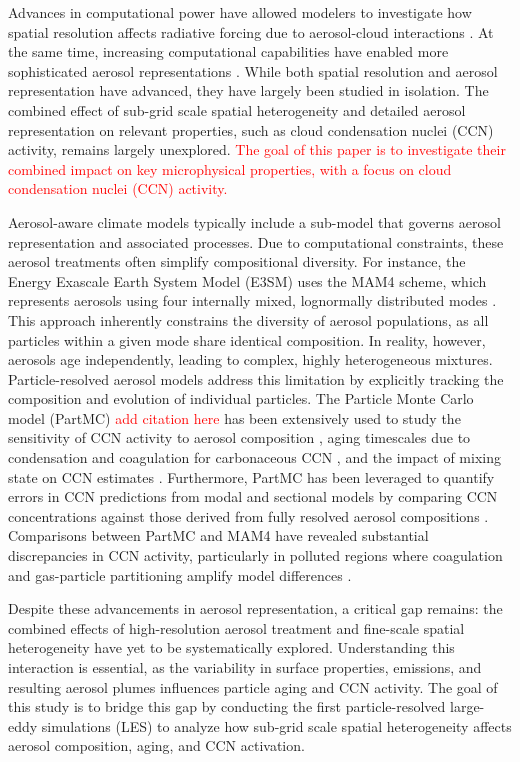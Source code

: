 \documentclass[journal abbreviation, manuscript]{copernicus}
\begin{document}
Advances in computational power have allowed modelers to investigate
how spatial resolution affects radiative forcing due to aerosol-cloud
interactions \citep{ma_how_2015}. At the same time, increasing
computational capabilities have enabled more sophisticated aerosol
representations \citep{zaveri_development_2021,
  tilmes_description_2023}. While both spatial resolution and aerosol
representation have advanced, they have largely been studied in
isolation. The combined effect of sub-grid scale spatial heterogeneity
and detailed aerosol representation on relevant properties, such as
cloud condensation nuclei (CCN) activity, remains largely unexplored.
\textcolor{red}{The goal of this paper is to investigate their
  combined impact on key microphysical properties, with a focus on
  cloud condensation nuclei (CCN) activity.}

Aerosol-aware climate models typically include a sub-model that
governs aerosol representation and associated processes. Due to
computational constraints, these aerosol treatments often simplify
compositional diversity. For instance, the Energy Exascale Earth
System Model (E3SM) uses the MAM4 scheme, which represents aerosols
using four internally mixed, lognormally distributed modes
\citep{golaz_doe_2022}. This approach inherently constrains the
diversity of aerosol populations, as all particles within a given mode
share identical composition. In reality, however, aerosols age
independently, leading to complex, highly heterogeneous
mixtures. Particle-resolved aerosol models address this limitation by
explicitly tracking the composition and evolution of individual
particles. The Particle Monte Carlo model (PartMC) \textcolor{red}{add
  citation here} has been extensively used to study the sensitivity of
CCN activity to aerosol composition \citep{fierce_when_2013}, aging
timescales due to condensation and coagulation for carbonaceous CCN
\citep{fierce_explaining_2015}, and the impact of mixing state on CCN
estimates \citep{ching_metrics_2017}. Furthermore, PartMC has been
leveraged to quantify errors in CCN predictions from modal and
sectional models by comparing CCN concentrations against those derived
from fully resolved aerosol compositions
\citep{zaveri_particle-resolved_2010, ching_metrics_2017}. Comparisons
between PartMC and MAM4 have revealed substantial discrepancies in CCN
activity, particularly in polluted regions where coagulation and
gas-particle partitioning amplify model differences
\citep{fierce_quantifying_2024}.

Despite these advancements in aerosol representation, a critical gap
remains: the combined effects of high-resolution aerosol treatment and
fine-scale spatial heterogeneity have yet to be systematically
explored. Understanding this interaction is essential, as the
variability in surface properties, emissions, and resulting aerosol
plumes influences particle aging and CCN activity. The goal of this
study is to bridge this gap by conducting the first particle-resolved
large-eddy simulations (LES) to analyze how sub-grid scale spatial
heterogeneity affects aerosol composition, aging, and CCN activation.
\end{document}
